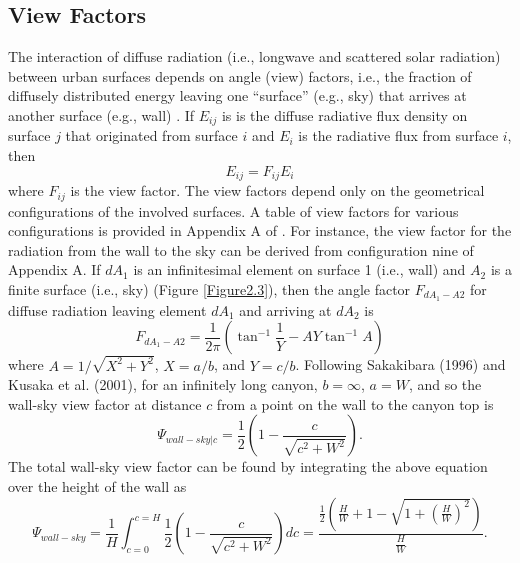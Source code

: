 \documentclass[12pt,authoryear]{elsarticle}
\numberwithin{equation}{section} %
\begin{document}
\subsection{View Factors}
%
The interaction of diffuse radiation (i.e., longwave and scattered solar radiation) between urban surfaces depends on angle (view) factors, i.e., the fraction of diffusely distributed energy leaving one ``surface'' (e.g., sky) that arrives at another surface (e.g., wall) \citep{sparrowRadiationHeatTransfer1978}. If $E_{ij}$ is is the diffuse radiative flux density on surface $j$ that originated from surface $i$ and $E_{i}$ is the radiative flux from surface $i$, then
\begin{equation}
\label{eq:diffuse_radiative_density}
E_{ij} = F_{ij}E_{i}
\end{equation}
where $F_{ij}$ is the view factor. The view factors depend only on the geometrical configurations of the involved surfaces. A table of view factors for various configurations is provided in Appendix A of \citet{sparrowRadiationHeatTransfer1978}. For instance, the view factor for the radiation from the wall to the sky can be derived from configuration nine of Appendix A. If $dA_{1}$ is an infinitesimal element on surface 1 (i.e., wall) and $A_{2}$ is a finite surface (i.e., sky) (Figure \ref{Figure2.3}), then the angle factor $F_{dA_{1}-A{2}}$ for diffuse radiation leaving element $dA_{1}$ and arriving at $dA_{2}$ is
\begin{equation}
F_{dA_{1}-A{2}} = \frac{1}{2\pi}\left(\tan^{-1}\frac{1}{Y}-AY\tan^{-1}A\right)
\end{equation}
where $A=1/\sqrt{X^2+Y^2}$, $X=a/b$, and $Y=c/b$. Following Sakakibara (1996) and
Kusaka et al. (2001), for an infinitely long canyon, $b=\infty$, $a=W$, and so the wall-sky view factor at distance $c$ from a point on the wall to the canyon top is 
\begin{equation}
\Psi_{wall-sky|c}=\frac{1}{2}\left(1-\frac{c}{\sqrt{c^{2}+W^{2}}}\right).
\end{equation}
The total wall-sky view factor can be found by integrating the above equation over the
height of the wall as
\begin{equation}
\Psi_{wall-sky}=\frac{1}{H}\int_{c=0}^{c=H}\frac{1}{2}\left(1-\frac{c}{\sqrt{c^2+W^2}}\right)dc=\frac{\frac{1}{2}\left(\frac{H}{W}+1-\sqrt{1+\left(\frac{H}{W}\right)^2}\right)}{\frac{H}{W}}.
\end{equation}
\end{document}

